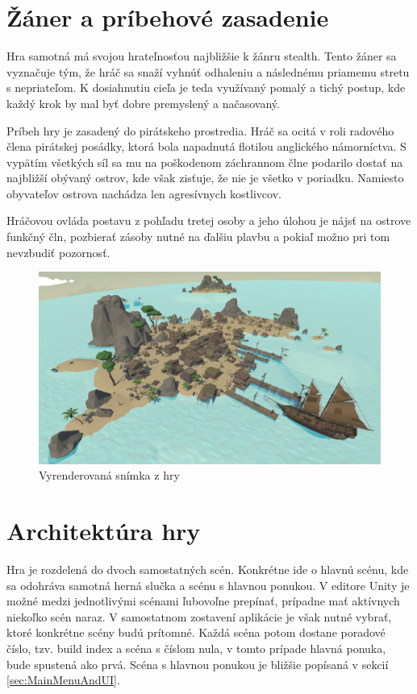 \documentclass[slovak, master]{diploma}
\begin{document}
\section{Žáner a príbehové zasadenie}
\label{sec:GenreAndSetting}
Hra samotná má svojou hrateľnosťou najbližšie k žánru stealth. Tento žáner sa vyznačuje tým, že hráč sa snaží vyhnúť odhaleniu a následnému priamemu stretu s nepriateľom. K dosiahnutiu cieľa je teda využívaný pomalý a tichý postup, kde každý krok by mal byť dobre premyslený a načasovaný. 

Príbeh hry je zasadený do pirátskeho prostredia. Hráč sa ocitá v roli radového člena pirátskej posádky, ktorá bola napadnutá flotilou anglického námorníctva. S vypätím všetkých síl sa mu na poškodenom záchrannom člne podarilo dostať na najbližší obývaný ostrov, kde však zisťuje, že nie je všetko v poriadku. Namiesto obyvateľov ostrova nachádza len agresívnych kostlivcov. 

Hráčovou ovláda postavu z pohľadu tretej osoby a jeho úlohou je nájsť na ostrove funkčný čln, pozbierať zásoby nutné na ďalšiu plavbu a pokiaľ možno pri tom nevzbudiť pozornosť.

\begin{figure}[!htbp]
	\centering
	\includegraphics[width=.9\textwidth]{Figures/game_compressed.png}
	\caption{Vyrenderovaná snímka z hry}
	\label{pic:GameScreenshot}
\end{figure}

\section{Architektúra hry}
\label{sec:GameStructure}
Hra je rozdelená do dvoch samostatných scén. Konkrétne ide o hlavnú scénu, kde sa odohráva samotná herná slučka a scénu s hlavnou ponukou. V editore Unity je možné medzi jednotlivými scénami ľubovoľne prepínať, prípadne mať aktívnych niekoľko scén naraz. V samostatnom zostavení aplikácie je však nutné vybrať, ktoré konkrétne scény budú prítomné. Každá scéna potom dostane poradové číslo, tzv. build index a scéna s číslom nula, v tomto prípade hlavná ponuka, bude spustená ako prvá. Scéna s hlavnou ponukou je bližšie popísaná v sekcií \ref{sec:MainMenuAndUI}.
\end{document}
